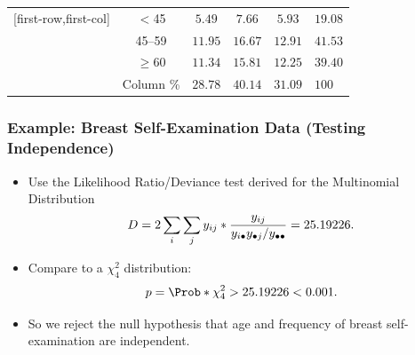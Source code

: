 \documentclass[oneside]{book}\usepackage[]{graphicx}\usepackage[svgnames]{xcolor}
\let\log\relax%
\begin{document}
\begin{itemize}
\begin{table}[H]
\begin{NiceTabular}{c|ccc|c}[first-row,first-col]
                        \midrule
                         & $<$45     & $ 5.49 $                         & $ 7.66 $    & $ 5.93 $  & $ 19.08 $  \\
                        & 45--59                     & $ 11.95 $                       & $ 16.67 $   & $ 12.91 $ & $ 41.53 $  \\
                        & $ \ge $60                  & $ 11.34 $                       & $ 15.81 $   & $ 12.25 $ & $ 39.40 $  \\
                        \midrule
                        & Column \%                       & $ 28.78 $                         & $ 40.14  $      & $ 31.09 $    & $ 100 $
                  \end{NiceTabular}
            \end{table}
\end{itemize}
\subsubsection*{Example: Breast Self-Examination Data (Testing Independence)}
\begin{itemize}
      \item Use the Likelihood Ratio/Deviance test derived for the Multinomial Distribution
            \[ D=2\sum_i\sum_j y_{ij}\log*{\frac{y_{ij}}{y_{i\bullet}y_{\bullet j}/y_{\bullet\bullet}}}=25.19226. \]
      \item Compare to a $ \chi^2_{4} $ distribution:
            \[ p=\Prob*{\chi^2_{4}>25.19226}<0.001. \]
      \item So we reject the null hypothesis that age and frequency of breast self-examination
            are independent.
\end{itemize}
\end{document}

